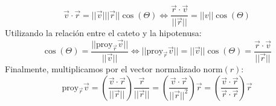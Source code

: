 \[\Vec{v} \cdot  \Vec{r} = \vert\vert \Vec{v}\vert\vert\vert \Vec{r}\vert\vert\cos(\Theta)\Longleftrightarrow \dfrac{\Vec{r} \cdot  \Vec{v}}{\vert\vert \Vec{r}\vert\vert} = \vert\vert v\vert\vert\cos(\Theta)\]
Utilizando la relación entre el cateto y la hipotenusa:
\[\cos(\Theta)=\dfrac{\vert\vert \text{proy}_{\Vec{r}}\Vec{v}\vert\vert}{\vert\vert \Vec{v}\vert\vert}\Longleftrightarrow \vert\vert \text{proy}_{\Vec{r}}\Vec{v}\vert\vert=\vert\vert \Vec{v}\vert\vert\cos(\Theta)=\dfrac{\Vec{r} \cdot  \Vec{v}}{\vert\vert \Vec{r}\vert\vert}\]
Finalmente, multiplicamos por el vector normalizado \(\text{norm}(r)\):
\[ \text{proy}_{\Vec{r}}\Vec{v}=\left(\dfrac{\Vec{v}\cdot\Vec{r}}{\vert\vert \Vec{r}\vert\vert}\right)\dfrac{\Vec{r}}{\vert\vert\Vec{r}\vert\vert}=\left(\dfrac{\Vec{v}\cdot\Vec{r}}{\vert\vert \Vec{r}\vert\vert^2}\right)\Vec{r}=\left(\dfrac{\Vec{v}\cdot \Vec{r}}{\Vec{r}\cdot \Vec{r}}\right)\Vec{r}\]

